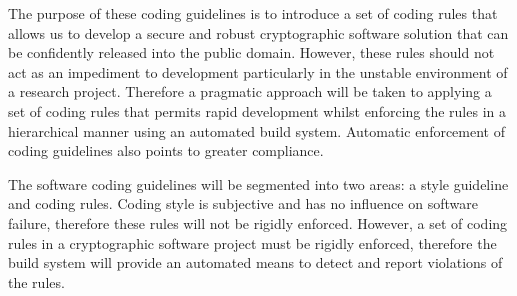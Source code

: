 The purpose of these coding guidelines is to introduce a set of coding rules that allows us to develop a secure and robust cryptographic software solution that can be confidently released into the public domain. However, these rules should not act as an impediment to development particularly in the unstable environment of a research project. Therefore a pragmatic approach will be taken to applying a set of coding rules that permits rapid development whilst enforcing the rules in a hierarchical manner using an automated build system. Automatic enforcement of coding guidelines also points to greater compliance.

The software coding guidelines will be segmented into two areas: a style guideline and coding rules. Coding style is subjective and has no influence on software failure, therefore these rules will not be rigidly enforced. However, a set of coding rules in a cryptographic software project must be rigidly enforced, therefore the build system will provide an automated means to detect and report violations of the rules.
